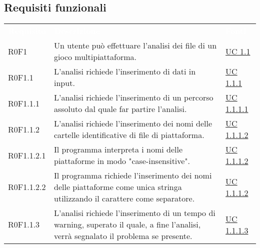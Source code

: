 	
	\subsection{Requisiti funzionali}
		\begin{center}
			\begin{longtable}{p{4.2cm}!{\color{white}\vrule width 0.5mm}p{6cm}!{\color{white}\vrule width 0.5mm}p{2.5cm}!{\color{white}\vrule width 0.5mm}}
				\textcolor{white}{\textbf{Requisito}}&\textcolor{white}{\textbf{Descrizione}}&\textcolor{white}{\textbf{Fonti}}\\
				
				\hspace{0mm}\hypertarget{R0F1}{R0F1}  & Un utente può effettuare l'analisi dei file di un gioco multipiattaforma. & \hyperref[subsec:UC1.1]{UC 1.1}\\
				
				
				\hspace{2mm}\hypertarget{R0F1.1}{R0F1.1}  & L'analisi richiede l'inserimento di dati in input. & \hyperref[subsec:UC1.1.1]{UC 1.1.1}\\
				
				\hspace{4mm}\hypertarget{R0F1.1.1}{R0F1.1.1}  & L'analisi richiede l'inserimento di un percorso assoluto dal quale far partire l'analisi. & \hyperref[subsec:UC1.1.1.1]{UC 1.1.1.1}\\
				
				\hspace{4mm}\hypertarget{R0F1.1.2}{R0F1.1.2}  & L'analisi richiede l'inserimento dei nomi delle cartelle identificative di file di piattaforma. & \hyperref[subsec:UC1.1.1.2]{UC 1.1.1.2}\\
				
				\hspace{6mm}\hypertarget{R0F1.1.2.1}{R0F1.1.2.1}  & Il programma interpreta i nomi delle piattaforme in modo "case-insensitive". & \hyperref[subsec:UC1.1.1.2]{UC 1.1.1.2}\\
				
				\hspace{6mm}\hypertarget{R0F1.1.2.2}{R0F1.1.2.2}  & Il programma richiede l'inserimento dei nomi delle piattaforme come unica stringa utilizzando il carattere \sq{;} come separatore. & \hyperref[subsec:UC1.1.1.2]{UC 1.1.1.2}\\
				
				\hspace{4mm}\hypertarget{R0F1.1.3}{R0F1.1.3}  & L'analisi richiede l'inserimento di un tempo di warning, superato il quale, a fine l'analisi, verrà segnalato il problema se presente. & \hyperref[subsec:UC1.1.1.3]{UC 1.1.1.3}\\
				

\end{longtable}
\end{center}
